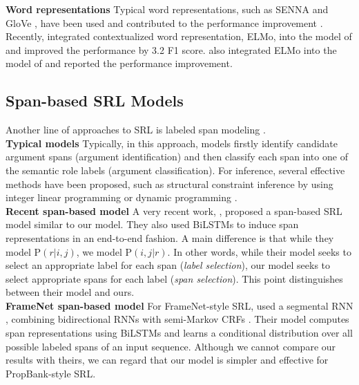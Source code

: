 \documentclass[11pt,a4paper]{article}
\begin{document}
\noindent
{\bf Word representations} \hspace{0.2cm} Typical word representations, such as SENNA \cite{collobert:11} and GloVe \cite{pennington:14}, have been used and contributed to the performance improvement \cite{collobert:11,zhou:15,he:17}.
Recently,  integrated contextualized word representation, ELMo, into the model of  and improved the performance by 3.2 F1 score.
 also integrated ELMo into the model of  and reported the performance improvement.

\subsection{Span-based SRL Models}
Another line of approaches to SRL is labeled span modeling \cite{xue:04,koomen:05,toutanova:05}.\\

\vspace{-0.3cm}
\noindent
{\bf Typical models} \hspace{0.2cm} 
Typically, in this approach, models firstly identify candidate argument spans (argument identification) and then classify each span into one of the semantic role labels (argument classification).
For inference, several effective methods have been proposed, such as structural constraint inference by using integer linear programming \cite{punyakanok:08} or dynamic programming \cite{oscar:15,fitzgerald:15}.\\

\vspace{-0.3cm}
\noindent
{\bf Recent span-based model} \hspace{0.2cm} A very recent work, , proposed a span-based SRL model similar to our model.
They also used BiLSTMs to induce span representations in an end-to-end fashion.
A main difference is that while they model $\text{P}(r | i, j)$, we model $\text{P}(i, j | r)$.
In other words, while their model seeks to select an appropriate label for each span ({\it label selection}), our model seeks to select appropriate spans for each label ({\it span selection}).
This point distinguishes between their model and ours.\\

\vspace{-0.3cm}
\noindent
{\bf FrameNet span-based model} \hspace{0.2cm} For FrameNet-style SRL,  used a segmental RNN \cite{kong:16}, combining bidirectional RNNs with semi-Markov CRFs \cite{sarawagi:04}.
Their model computes span representations using BiLSTMs and learns a conditional distribution over all possible labeled spans of an input sequence.
Although we cannot compare our results with theirs, we can regard that our model is simpler and effective for PropBank-style SRL.
\end{document}

